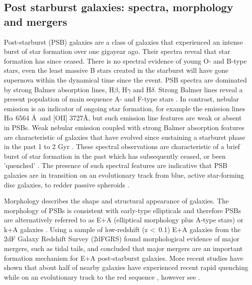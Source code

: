 \subsection{Post starburst galaxies: spectra, morphology and mergers}
\label{post-starburst-galaxies}
Post-starburst (PSB) galaxies are a class of galaxies that experienced an intense burst of star formation over one gigayear ago. Their spectra reveal that star formation has since ceased. There is no spectral evidence of young O- and B-type stars, even the least massive B stars created in the starburst will have gone supernova within the dynamical time since the  event. PSB spectra are dominated by strong Balmer absorption lines, H$\beta$, H$\gamma$ and H$\delta$. Strong Balmer lines reveal a present population of main sequence A- and F-type stars \citep{1997A&A...325.1025P}. In contrast, nebular emission is an indicator of ongoing star formation, for example the emission lines H$\alpha$ 6564 \AA\ and [OII] 3727\AA, but such emission line features are weak or absent in PSBs. Weak nebular emission coupled with strong Balmer absorption features are characteristic of galaxies that have evolved since sustaining a starburst phase in the past 1 to 2 Gyr \citep{2001ApJ...547L..17B,2003PASJ...55..771G,2004MNRAS.355..713B,2005MNRAS.357..937G,2018MNRAS.477.1708P}. These spectral observations are characteristic of a brief burst of star formation in the past which has subsequently ceased, or been 'quenched' \citep{1983ApJ...270....7D,1987MNRAS.229..423C,1997A&A...325.1025P}. The presence of such spectral features are indicative that PSB galaxies are in transition on an evolutionary track from blue, active star-forming disc galaxies, to redder passive spheroids \citep{2004MNRAS.355..713B,2012MNRAS.420..672S,2013MNRAS.429.2212M}. 

Morphology describes the shape and structural appearance of galaxies. The morphology of PSBs is consistent with early-type ellipticals and therefore PSBs are alternatively referred to as E+A (elliptical morphology plus A-type stars) or k+A galaxies \citep{1983ApJ...270....7D,1996ApJ...466..104Z,2009ARA&A..47..159B}. Using a sample of low-redshift (z \textless\ 0.1) E+A galaxies from the 2dF Galaxy Redshift Survey (2dFGRS) \citet{2004MNRAS.355..713B} found morphological evidence of major mergers, such as tidal tails, and concluded that major mergers are an important formation mechanism for E+A post-starburst galaxies. More recent studies have shown that about half of nearby galaxies have experienced recent rapid quenching while on an evolutionary track to the red sequence \citep{Martin_2007,10.1111/j.1365-2966.2009.14537.x,2015MNRAS.450..435S}, however see \cite{2017ApJ...845..145W}. 

